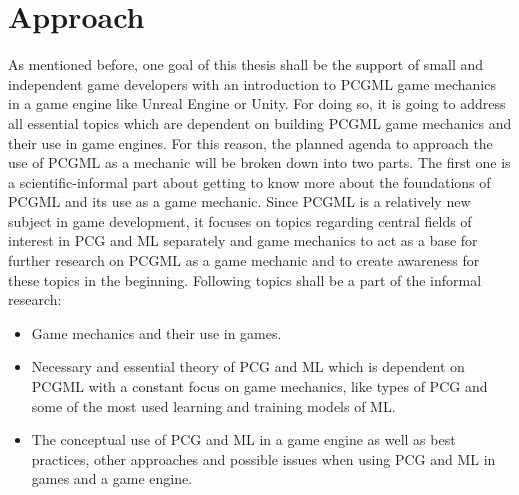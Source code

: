 \documentclass[MGS,Master,english]{twbook}%
\begin{document}
\section{Approach}
As mentioned before, one goal of this thesis shall be the support of small and independent game developers with an introduction to PCGML game mechanics in a game engine like Unreal Engine or Unity. For doing so, it is going to address all essential topics which are dependent on building PCGML game mechanics and their use in game engines. For this reason, the planned agenda to approach the use of PCGML as a mechanic will be broken down into two parts. The first one is a scientific-informal part about getting to know more about the foundations of \ac{PCGML} and its use as a game mechanic. Since \ac{PCGML} is a relatively new subject in game development, it focuses on topics regarding central fields of interest in \ac{PCG} and \ac{ML} separately and game mechanics to act as a base for further research on \ac{PCGML} as a game mechanic and to create awareness for these topics in the beginning. Following topics shall be a part of the informal research:
\begin{itemize}
	\item Game mechanics and their use in games.
	\item Necessary and essential theory of PCG and ML which is dependent on PCGML with a constant focus on game mechanics, like types of PCG and some of the most used learning and training models of ML.
	\item The conceptual use of PCG and ML in a game engine as well as best practices, other approaches and possible issues when using PCG and ML in games and a game engine.
\end{itemize}
\end{document}
